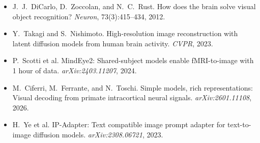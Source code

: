 \documentclass[10pt]{article}
\begin{document}
\small
\begin{itemize}[leftmargin=*,topsep=0pt,itemsep=0pt]
    \item J.\ J.\ DiCarlo, D.\ Zoccolan, and N.\ C.\ Rust. How does the brain solve visual object recognition? \textit{Neuron}, 73(3):415--434, 2012.
    \item Y.\ Takagi and S.\ Nishimoto. High-resolution image reconstruction with latent diffusion models from human brain activity. \textit{CVPR}, 2023.
    \item P.\ Scotti et al. MindEye2: Shared-subject models enable fMRI-to-image with 1 hour of data. \textit{arXiv:2403.11207}, 2024.
    \item M.\ Ciferri, M.\ Ferrante, and N.\ Toschi. Simple models, rich representations: Visual decoding from primate intracortical neural signals. \textit{arXiv:2601.11108}, 2026.
    \item H.\ Ye et al. IP-Adapter: Text compatible image prompt adapter for text-to-image diffusion models. \textit{arXiv:2308.06721}, 2023.
\end{itemize}
\end{document}
